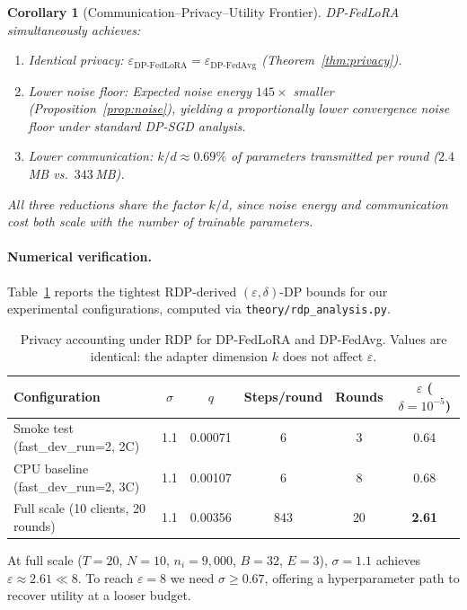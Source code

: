 ﻿\documentclass{article}
\newtheorem{corollary}{Corollary}
\newcommand{\method}{DP-FedLoRA}
\renewcommand{\eps}{\varepsilon}
\newcommand{\noise}{\sigma}
\begin{document}
\begin{corollary}[Communication--Privacy--Utility Frontier]
\label{cor:frontier}
\method{} simultaneously achieves:
\begin{enumerate}
  \item \emph{Identical privacy:} $\eps_{\text{\method{}}} = \eps_{\text{DP-FedAvg}}$
        (Theorem~\ref{thm:privacy}).
  \item \emph{Lower noise floor:} Expected noise energy $145{\times}$ smaller
        (Proposition~\ref{prop:noise}), yielding a proportionally lower
        convergence noise floor under standard DP-SGD analysis.
  \item \emph{Lower communication:} $k/d \approx 0.69\%$ of parameters
        transmitted per round ($2.4$\,MB vs.\ $343$\,MB).
\end{enumerate}
All three reductions share the factor $k/d$, since noise energy and
communication cost both scale with the number of trainable parameters.
\end{corollary}

\paragraph{Numerical verification.}
Table~\ref{tab:rdp} reports the tightest RDP-derived $(\eps, \delta)$-DP
bounds for our experimental configurations, computed via
\texttt{theory/rdp\_analysis.py}.

\begin{table}[h]
\centering
\caption{Privacy accounting under RDP for \method{} and DP-FedAvg.
Values are identical: the adapter dimension $k$ does not affect $\eps$.}
\label{tab:rdp}
\begin{tabular}{lccccc}
\toprule
Configuration & $\noise$ & $q$ & Steps/round & Rounds & $\eps$ ($\delta{=}10^{-5}$) \\
\midrule
Smoke test (fast\_dev\_run=2, 2C) & 1.1 & 0.00071 & 6  & 3  & 0.64 \\
CPU baseline (fast\_dev\_run=2, 3C) & 1.1 & 0.00107 & 6  & 8  & 0.68 \\
Full scale (10 clients, 20 rounds) & 1.1 & 0.00356 & 843 & 20 & \textbf{2.61} \\
\bottomrule
\end{tabular}
\end{table}

At full scale ($T{=}20$, $N{=}10$, $n_i{=}9{,}000$, $B{=}32$, $E{=}3$),
$\noise{=}1.1$ achieves $\eps \approx 2.61 \ll 8$.
To reach $\eps{=}8$ we need $\noise \geq 0.67$, offering a hyperparameter
path to recover utility at a looser budget.
\end{document}

